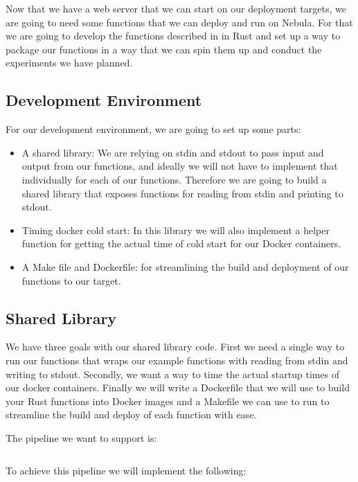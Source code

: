 \documentclass[
  table]{report}
\providecommand{\tightlist}{%
  \setlength{\itemsep}{0pt}\setlength{\parskip}{0pt}}
\begin{document}
Now that we have a web server that we can start on our deployment
targets, we are going to need some functions that we can deploy and run
on Nebula. For that we are going to develop the functions described in
 in Rust and set up a way to package our
functions in a way that we can spin them up and conduct the experiments
we have planned.

\subsection{Development Environment}

For our development environment, we are going to set up some parts:

\begin{itemize}
\tightlist
\item
  A shared library: We are relying on stdin and stdout to pass input and
  output from our functions, and ideally we will not have to implement
  that individually for each of our functions. Therefore we are going to
  build a shared library that exposes functions for reading from stdin
  and printing to stdout.
\item
  Timing docker cold start: In this library we will also implement a
  helper function for getting the actual time of cold start for our
  Docker containers.
\item
  A Make file and Dockerfile: for streamlining the build and deployment
  of our functions to our target.
\end{itemize}

\subsection{Shared Library}
\label{sect:shared_lib}

We have three goals with our shared library code. First we need a single
way to run our functions that wraps our example functions with reading
from stdin and writing to stdout. Secondly, we want a way to time the
actual startup times of our docker containers. Finally we will write a
Dockerfile that we will use to build your Rust functions into Docker
images and a Makefile we can use to run to streamline the build and
deploy of each function with ease.

The pipeline we want to support is:

\inputminted[firstline=6, lastline=9]{bash}{assets/code/commands.sh}

To achieve this pipeline we will implement the following:
\end{document}
